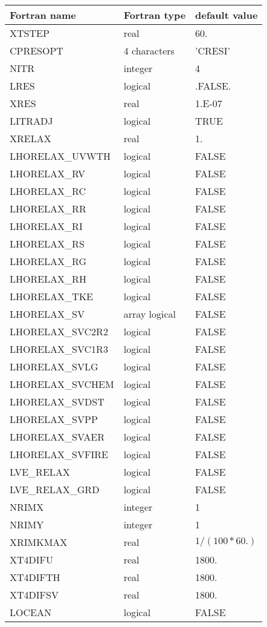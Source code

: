 \begin{longtable} {|p{}|p{}|p{}|}
\hline
Fortran name &  Fortran type & default value \\
\hline 
\endhead
\hline
\endfoot
XTSTEP    & real   & 60.  \\
CPRESOPT  & 4 characters  & 'CRESI'  \\
NITR      & integer   & 4   \\
LRES        & logical        & .FALSE. \\
XRES        & real           & 1.E-07  \\
LITRADJ   & logical   & TRUE  \\
XRELAX    & real     & 1.   \\
LHORELAX\_UVWTH &  logical  & FALSE  \\
LHORELAX\_RV &  logical  & FALSE  \\
LHORELAX\_RC &  logical  & FALSE  \\
LHORELAX\_RR &  logical  & FALSE  \\
LHORELAX\_RI &  logical  & FALSE  \\
LHORELAX\_RS &  logical  & FALSE  \\
LHORELAX\_RG &  logical  & FALSE  \\
LHORELAX\_RH &  logical  & FALSE  \\
LHORELAX\_TKE &  logical  & FALSE  \\
LHORELAX\_SV & array logical & FALSE  \\
LHORELAX\_SVC2R2 &   logical & FALSE  \\
LHORELAX\_SVC1R3 &   logical & FALSE  \\
LHORELAX\_SVLG   &   logical & FALSE  \\
LHORELAX\_SVCHEM &   logical & FALSE  \\
LHORELAX\_SVDST  &   logical & FALSE  \\
LHORELAX\_SVPP   &   logical & FALSE  \\
LHORELAX\_SVAER  &   logical & FALSE  \\
LHORELAX\_SVFIRE  &   logical & FALSE  \\
LVE\_RELAX&  logical  & FALSE  \\
LVE\_RELAX\_GRD&  logical  & FALSE  \\
NRIMX     & integer   & 1   \\
NRIMY     & integer   & 1   \\
XRIMKMAX  &  real     & $1 / (100*60.) $ \\
XT4DIFU   &  real     & 1800.  \\
XT4DIFTH  &  real     & 1800.  \\
XT4DIFSV  &  real     & 1800.  \\
LOCEAN    &  logical  & FALSE \\
\end{longtable}

